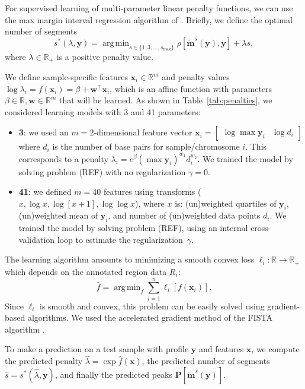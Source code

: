 \documentclass{article}
\DeclareMathOperator*{\argmin}{arg\,min}
\newcommand{\RR}{\mathbb R}
\begin{document}
For supervised learning of multi-parameter linear penalty functions,
we can use the max margin interval regression algorithm of
\citet{HOCKING-penalties}. Briefly, we define the optimal number of
segments
\begin{equation}
  s^*(\lambda, \mathbf y) = 
  \argmin_{s\in\{1,3,\dots, s_{\text{max}}\}}
  \rho\left[
    \mathbf{\tilde m}^s(\mathbf y),
    \mathbf y
  \right]
  + \lambda s,
\end{equation}
where $\lambda\in\RR_+$ is a positive
penalty value. 

We define sample-specific features $\mathbf x_i\in\RR^m$ and penalty
values $\log \lambda_i = f(\mathbf x_i) = \beta + \mathbf w^\intercal
\mathbf x_i$, which is an affine function with parameters
$\beta\in\RR,\mathbf w\in\RR^m$ that will be learned. As shown in
Table~\ref{tab:penalties}, we considered learning models with 3 and 41
parameters:

\begin{itemize}
\item \textbf{3}: we used an $m=2$-dimensional feature
  vector $\mathbf x_i = \left[\begin{array}{cc} \log\max \mathbf y_i &
      \log d_i
\end{array}\right]$ where $d_i$ is the number of base pairs for 
sample/chromosome $i$.  This corresponds to a penalty $\lambda_i =
e^\beta (\max\mathbf y_i)^{w_1} d_i^{w_2}$. We trained the
model by solving problem (REF) with no regularization $\gamma=0$.
\item \textbf{41}: we defined $m=40$ features using transforms ($x,
  \log x, \log[x+1], \log\log x$), where $x$ is: (un)weighted
  quartiles of $\mathbf y_i$, (un)weighted mean of $\mathbf y_i$, and
  number of (un)weighted data points $d_i$. We trained the model by solving
  problem (REF), using an internal cross-validation loop to estimate
  the regularization~$\gamma$.
\end{itemize}
The learning algorithm amounts to minimizing a
smooth convex loss $\ell_i:\RR\rightarrow\RR_+$ which depends on the
annotated region data $R_i$:
\begin{equation}
  \label{eq:relax}
  \hat f = \argmin_f \sum_{i=1}^n
  \ell_i\left[ f(\mathbf x_i) \right].
\end{equation}
Since $\ell_i$ is smooth and convex, this problem can be easily solved
using gradient-based algorithms. We used the accelerated gradient
method of the FISTA algorithm \citep{fista}.

To make a prediction on a
test sample with profile $\mathbf y$ and features $\mathbf x$, we
compute the predicted penalty $\hat \lambda = \exp \hat f(\mathbf x)$,
the predicted number of segments $\hat s = s^*(\hat \lambda, \mathbf
y)$, and finally the predicted peaks $\mathbf P\left[ \mathbf{\tilde
    m}^{\hat s}(\mathbf y) \right]$.
\end{document}
